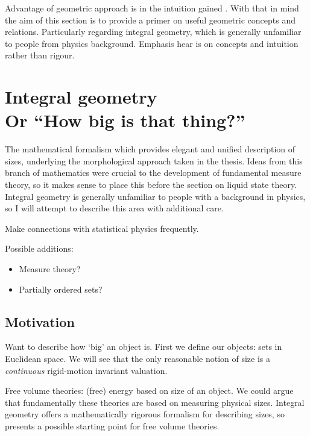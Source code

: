 Advantage of geometric approach is in the intuition gained%
.
With that in mind the aim of this section is to provide a primer on useful geometric concepts and relations.
Particularly regarding integral geometry, which is generally unfamiliar to people from physics background.
Emphasis hear is on concepts and intuition rather than rigour.

\section[Integral geometry. Or ``How big is that thing?'']{Integral geometry\\ {\large Or ``How big is that thing?''}}

The mathematical formalism which provides elegant and unified description of sizes, underlying the morphological approach taken in the thesis.
Ideas from this branch of mathematics were crucial to the development of fundamental measure theory, so it makes sense to place this before the section on liquid state theory.
Integral geometry is generally unfamiliar to people with a background in physics, so I will attempt to describe this area with additional care.

Make connections with statistical physics frequently.

Possible additions:
\begin{itemize}
\item Measure theory?
\item Partially ordered sets?
\end{itemize}

\subsection{Motivation}

Want to describe how `big' an object is.
First we define our objects: sets in Euclidean space.
We will see that the only reasonable notion of size is a \emph{continuous} rigid-motion invariant valuation.

Free volume theories: (free) energy based on size of an object.
We could argue that fundamentally these theories are based on measuring physical sizes.
Integral geometry offers a mathematically rigorous formalism for describing sizes, so presents a possible starting point for free volume theories.

